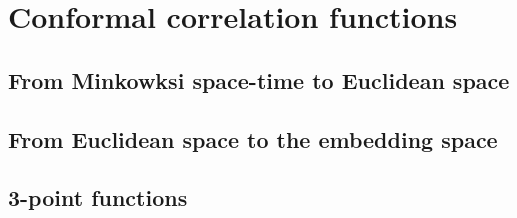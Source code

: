 \documentclass[a4paper,12pt]{article}
\numberwithin{equation}{section}
\begin{document}

\section{Conformal correlation functions}
\label{sec:correlators}


%
%
%
%


\subsection{From Minkowksi space-time to Euclidean space}

%
%
%
%


\subsection{From Euclidean space to the embedding space}
%
%
%
%
%
%
%
%
%
%
%

\subsection{3-point functions}

%
%
%
%
%
%
\end{document}
